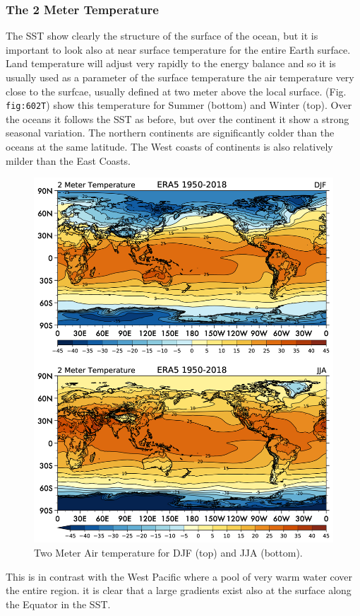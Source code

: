\subsubsection{The 2 Meter Temperature}\label{the-2-meter-temperature}

The SST show clearly the structure of the surface of the ocean, but it
is important to look also at near surface temperature for the entire
Earth surface. Land temperature will adjust very rapidly to the energy
balance and so it is usually used as a parameter of the surface
temperature the air temperature very close to the surfcae, usually
defined at two meter above the local surface. (Fig. \texttt{fig:602T})
show this temperature for Summer (bottom) and Winter (top). Over the
oceans it follows the SST as before, but over the continent it show a
strong seasonal variation. The northern continents are significantly
colder than the oceans at the same latitude. The West coasts of
continents is also relatively milder than the East Coasts.

\begin{figure}
\centering
\includegraphics[width = .7 \textwidth]{figs/GD/2T.png}
\caption{Two Meter Air temperature for DJF (top) and JJA (bottom).}
\label{fig:}
\end{figure}

This is in contrast with the West Pacific where a pool of very warm
water cover the entire region. it is clear that a large gradients exist
also at the surface along the Equator in the SST.

